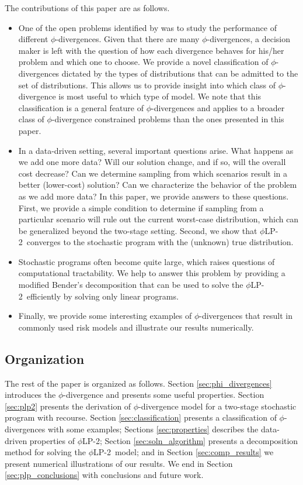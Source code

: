 \documentclass[12pt]{article}
\theoremstyle{plain}
\theoremstyle{definition}
\theoremstyle{remark}
\newcommand{\plp}{$\phi$LP-2}
\begin{document}
The contributions of this paper are as follows. 
\begin{itemize}
	\item One of the open problems identified by \citet{bental2011robust} was to study the performance of different $\phi$-divergences.
		Given that there are many $\phi$-divergences, a decision maker is left with the question of how each divergence behaves for his/her problem and which one to choose.
		We provide a novel classification of $\phi$-divergences dictated by the types of distributions that can be admitted to the set of distributions. 
		This allows us to provide insight into which class of $\phi$-divergence is most useful to which type of model.
		We note that this classification is a general feature of $\phi$-divergences and applies to a broader class of $\phi$-divergence constrained problems than the ones presented in this paper. 
		
	\item In a data-driven setting, several important questions arise.
		What happens as we add one more data?
		Will our solution change, and if so, will the overall cost decrease?
		Can we determine sampling from which scenarios result in a better (lower-cost) solution?
		Can we characterize the behavior of the problem as we add more data?
		In this paper, we provide answers to these questions.
		First, we provide a simple condition to determine if sampling from a particular scenario will rule out the current worst-case distribution, which can be generalized beyond the two-stage setting.
		Second, we show that \plp\ converges to the stochastic program with the (unknown) true distribution.
		
	\item Stochastic programs often become quite large, which raises questions of computational tractability.
		We help to answer this problem by providing a modified Bender's decomposition that can be used to solve the \plp\ efficiently by solving only linear programs. 

	\item Finally, we provide some interesting examples of $\phi$-divergences that result in commonly used risk models and illustrate our results numerically. 
\end{itemize}

\subsection{Organization}

The rest of the paper is organized as follows.
Section \ref{sec:phi_divergences} introduces the $\phi$-divergence and presents some useful properties.
Section \ref{sec:plp2} presents the derivation of $\phi$-divergence model for a two-stage stochastic program with recourse.
Section \ref{sec:classification} presents a classification of $\phi$-divergences with some examples;
Sections \ref{sec:properties} describes the data-driven properties of \plp; 
Section \ref{sec:soln_algorithm} presents a decomposition method for solving the \plp\ model; and in Section \ref{sec:comp_results} we present numerical illustrations of our results. 
We end in Section \ref{sec:plp_conclusions} with conclusions and future work.
\end{document}
